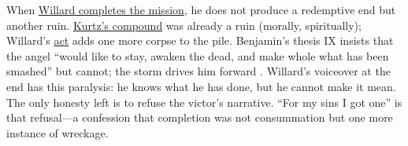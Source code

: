 When \hyperref[scene:assassination]{Willard completes the mission}, he does not produce a
redemptive end but another ruin. \hyperref[scene:kurtz-compound]{Kurtz's compound} was already
a ruin (morally, spiritually);
Willard's \hyperref[scene:assassination]{act} adds one more corpse to the pile. Benjamin's
thesis IX insists that the angel ``would like to stay, awaken the dead, and make whole what
has been smashed'' but cannot; the storm drives him forward
\parencite{BenjaminTheses1969}. Willard's voiceover at the end has this paralysis: he knows
what he has done, but he cannot make it mean. The only honesty left is to refuse the victor's
narrative. ``For my sins I got one'' is that refusal---a confession that completion was not
consummation but one more instance of wreckage.
